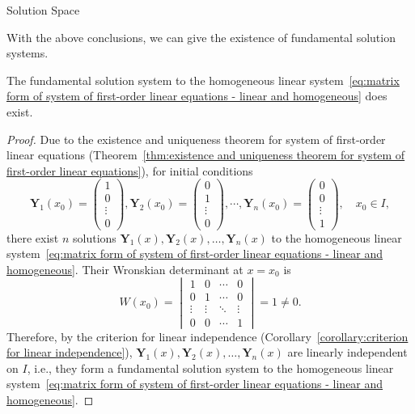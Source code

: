 \documentclass[11pt]{../../TexTemplate/elegantbook}
\begin{document}
\begin{leftbarTitle}{Solution Space}\end{leftbarTitle}
With the above conclusions, we can give the existence of fundamental solution systems.
\begin{theorem}
    The fundamental solution system to 
    the homogeneous linear system~\eqref{eq:matrix form of system of first-order linear equations - linear and homogeneous}
    does exist.
\end{theorem}

\begin{proof}
    Due to the existence and uniqueness theorem for system of first-order linear equations
    (Theorem~\ref{thm:existence and uniqueness theorem for system of first-order linear equations}),
    for initial conditions
    \begin{equation}\label{eq:initial conditions for fundamental solution system}
        \mathbf{Y}_{1}(x_{0}) = \begin{pmatrix} 1 \\ 0  \\ \vdots \\ 0 \end{pmatrix} ,
        \mathbf{Y}_{2}(x_{0}) = \begin{pmatrix} 0 \\ 1  \\ \vdots \\ 0 \end{pmatrix} ,
        \cdots,
        \mathbf{Y}_{n}(x_{0}) = \begin{pmatrix} 0 \\ 0  \\ \vdots \\ 1 \end{pmatrix} ,
        \quad x_{0} \in I,
    \end{equation}
    there exist \(n\) solutions \(\mathbf{Y}_{1}(x), \mathbf{Y}_{2}(x), \ldots, \mathbf{Y}_{n}(x)\) to 
    the homogeneous linear system~\eqref{eq:matrix form of system of first-order linear equations - linear and homogeneous}.
    Their Wronskian determinant at \(x = x_{0}\) is
    \[
    W(x_{0}) = \begin{vmatrix}1 & 0 & \cdots & 0 \\ 0 & 1 & \cdots & 0 \\ \vdots & \vdots & \ddots & \vdots \\ 0 & 0 & \cdots & 1 \end{vmatrix} = 1 \neq 0.
    \]
    Therefore, by the criterion for linear independence (Corollary~\ref{corollary:criterion for linear independence}),
    \(\mathbf{Y}_{1}(x), \mathbf{Y}_{2}(x), \ldots, \mathbf{Y}_{n}(x)\) are linearly independent on \(I\),
    i.e., they form a fundamental solution system to
    the homogeneous linear system~\eqref{eq:matrix form of system of first-order linear equations - linear and homogeneous}.
\end{proof}
\end{document}
